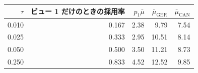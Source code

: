 \begin{tabular}{rrrrr}
\toprule
$\tau$ & ビュー 1 だけのときの採用率 & $p_1\bar\mu$ & $\bar\mu_{\mathrm{GER}}$ & $\bar\mu_{\mathrm{CAN}}$ \\
\midrule
0.010 & 0.167 & 2.38 & 9.79 & 7.54 \\
0.025 & 0.333 & 2.95 & 10.51 & 8.14 \\
0.050 & 0.500 & 3.50 & 11.21 & 8.73 \\
0.250 & 0.833 & 4.52 & 12.52 & 9.85 \\
\bottomrule
\end{tabular}
